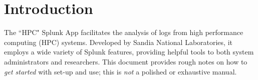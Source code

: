 \section{Introduction}
The ``HPC" Splunk App facilitates the analysis of logs from high performance
computing (HPC) systems.  Developed by Sandia National Laboratories, it employs
a wide variety of Splunk features, providing helpful tools to both system
administrators and researchers.  This document provides rough notes on how to
{\em get started} with set-up and use; this is {\em not} a polished or
exhaustive manual.
